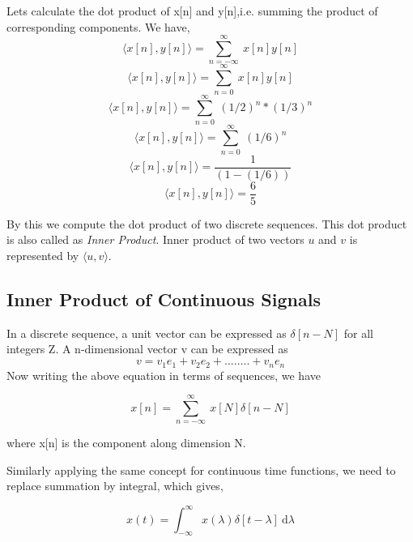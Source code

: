                   
  Lets calculate the dot product of x[n] and y[n],i.e. summing the product of corresponding components.
  We have,
   \begin{equation*} \langle x[n],y[n] \rangle = \sum_{n=-\infty}^{\infty}\ x[n]y[n]\end{equation*} 
   \begin{equation*} \langle x[n],y[n] \rangle = \sum_{n=0}^{\infty}\ x[n]y[n]\end{equation*} 
   \begin{equation*} \langle x[n],y[n] \rangle = \sum_{n=0}^{\infty}\ (1/2)^n*(1/3)^n\end{equation*} 
   \begin{equation*} \langle x[n],y[n] \rangle = \sum_{n=0}^{\infty}\ (1/6)^n\end{equation*} 
   \begin{equation*} \langle x[n],y[n] \rangle = \frac{1}{(1-(1/6))}\end{equation*} 
   \begin{equation*} \langle x[n],y[n] \rangle = \frac{6}{5}\end{equation*} 
  		
          
 	By this we compute the dot product of two discrete sequences. This dot product is also called as \textit{Inner Product}. Inner product of two vectors $u$ and $v$ is represented by $\langle u,v \rangle$.

\subsection{Inner Product of Continuous Signals}
       In a discrete sequence, a unit vector can be expressed as $\delta[n-N]$ for all integers Z. A n-dimensional vector v can be expressed as
        \begin{equation*}v = v_1e_1 + v_2e_2 + ........ + v_ne_n\end{equation*}
        Now writing the above equation in terms of sequences, we have
       
    	\begin{equation*}	x[n] = 	\sum_{n=-\infty}^{\infty}\ x[N]\delta[n-N]\end{equation*}
            
            where x[n] is the component along dimension N.
       
Similarly applying the same concept for continuous time functions, we need to replace summation by integral, which gives,

					\begin{equation*}x(t) = \int_{-\infty}^{\infty} \! x(\lambda)\delta[t-\lambda] \ \mathrm{d}\lambda\end{equation*}
                    
